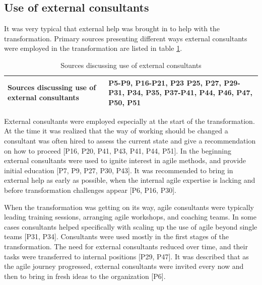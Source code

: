 
\subsection{Use of external consultants}

It was very typical that external help was brought in to help with the
transformation.
Primary sources presenting different ways external consultants were employed in
the transformation are listed in table \ref{table:transformation_consultants}.

\begin{table}[h]
    \centering
    \begin{tabular}{ >{\raggedright\arraybackslash}p{}
                     >{\raggedright\arraybackslash}p{} }
        \toprule
        Sources discussing use of external consultants  &
                P5-P9, P16-P21, P23 P25, P27, P29-P31,
                P34, P35, P37-P41, P44, P46, P47, P50, P51  \\  %
        \bottomrule
    \end{tabular}
    \caption{Sources discussing use of external consultants}
    \label{table:transformation_consultants}
\end{table}


External consultants were employed especially at the start of the
transformation. At the time it was realized that the way of working should be
changed a consultant was often hired to assess the current state and give a
recommendation on how to proceed [P16, P20, P41, P43, P41, P44, P51].
In the beginning external consultants were used to ignite interest in agile
methods, and provide initial education [P7, P9, P27, P30, P43].
It was recommended to bring in external help as early as possible, when the
internal agile expertise is lacking and before transformation challenges appear
[P6, P16, P30].

When the transformation was getting on its way, agile consultants were typically
leading training sessions, arranging agile workshops, and coaching teams.
In some cases consultants helped specifically with scaling up the use of agile
beyond single teams [P31, P34].
Consultants were used mostly in the first stages of the transformation.
The need for external consultants reduced over time, and their tasks were
transferred to internal positions [P29, P47].
It was described that as the agile journey progressed, external consultants were
invited every now and then to bring in fresh ideas to the organization [P6].

